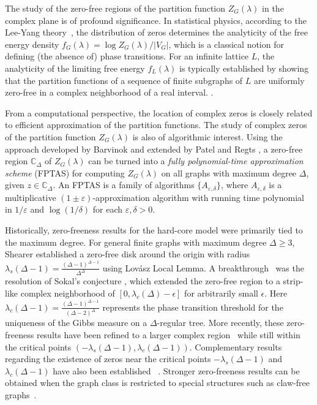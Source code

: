 \documentclass[a4paper,11pt]{article}
\theoremstyle{plain}
\theoremstyle{definition}
\theoremstyle{remark}
\newcommand{\1}{\mathbf{1}}
\begin{document}
The study of the zero-free regions of the partition function $Z_G(\lambda)$ in the complex plane is of profound significance.
In statistical physics, according to the Lee-Yang theory~\cite{lee1952statistical}, the distribution of zeros determines the analyticity of the free energy density $f_G(\lambda)=\log Z_G(\lambda)/|V_G|$, which is a classical notion for defining  (the absence of) phase transitions.
For an infinite lattice $L$, the analyticity of the limiting free energy $f_L(\lambda)$ is typically established by showing that the partition functions of a sequence of finite subgraphs of $L$ are uniformly zero-free in a complex neighborhood of a real interval.  \cite{scott2005repulsive, regts2018zero}.


From a computational perspective, the location of complex zeros is closely related to efficient approximation of the partition functions. 
The study of complex zeros of the partition function $Z_G(\lambda)$ is also of algorithmic interest. 
Using the approach developed by Barvinok \cite{barvinok2016combinatorics} and extended by Patel and Regts \cite{patel2017deterministic},
a zero-free region $\mathbb{C}_\Delta$ of $Z_G(\lambda)$  can be turned into a \emph{fully polynomial-time approximation scheme} (FPTAS) for  computing
$Z_G(\lambda)$ on all  graphs with maximum degree $\Delta$, given $z\in \mathbb{C}_\Delta$.
 An FPTAS is a family of algorithms $\{A_{\varepsilon,\delta}\}$, where  $A_{\varepsilon,\delta}$ is a multiplicative $(1\pm\varepsilon)$-approximation algorithm with running time polynomial in $1/\varepsilon$ and $\log(1/\delta)$ for each $\varepsilon,\delta>0$.

Historically, zero-freeness results for the hard-core model were primarily tied to the maximum degree.
For general finite graphs with maximum degree $\Delta\geq 3$,  Shearer \cite{shearer1985problem} established a zero-free disk around the origin with radius $\lambda_s(\Delta-1)=\frac{(\Delta-1)^{\Delta-1}}{\Delta^\Delta}$ using  Lovász Local Lemma.
A breakthrough~\cite{peters2019conjecture} was the resolution of Sokal's conjecture \cite{scott2005repulsive}, which extended the zero-free region to  a strip-like complex neighborhood of $[0,\lambda_c(\Delta)-\epsilon]$ for arbitrarily small $\epsilon$.
Here $\lambda_c(\Delta-1)=\frac{(\Delta-1)^{\Delta-1}}{(\Delta-2)^\Delta}$  represents the phase transition threshold for the uniqueness of the Gibbs measure on a $\Delta$-regular tree.
More recently,  these zero-freeness results have been refined to a larger complex region~\cite{bencs2023complex} while still within the critical points $(-\lambda_s(\Delta-1), \lambda_c(\Delta-1))$.
Complementary results regarding the existence of zeros near the critical points $-\lambda_s(\Delta-1)$ and $\lambda_c(\Delta-1)$ have also been established ~\cite{peters2019conjecture}.
Stronger zero-freeness results can be obtained when the graph class is restricted to special structures such as claw-free graphs~\cite{heilmann1972theory, chudnovskyseymour07, jerrum2025zero}. 
\end{document}
